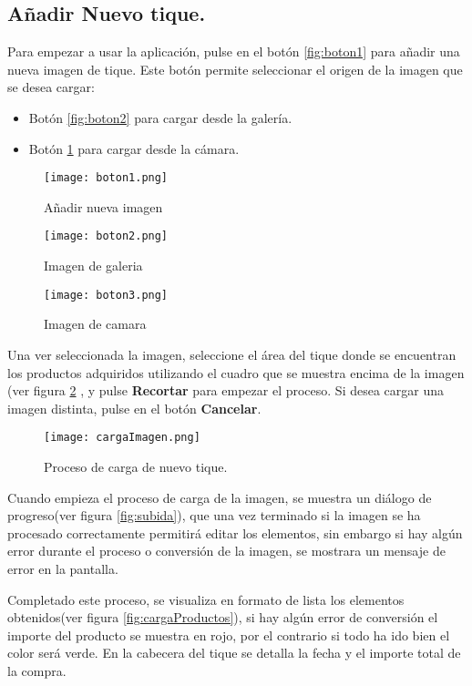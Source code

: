 \subsection{Añadir Nuevo tique.\label{nuevosTiques}}
 Para empezar a usar la aplicación, pulse en el botón \ref{fig:boton1}
 para añadir una nueva imagen de tique. Este botón permite seleccionar el origen de la imagen que se desea cargar:
 \begin{itemize}
 	\item Botón \ref{fig:boton2} para cargar desde la galería.
 	\item Botón \ref{fig:boton3} para cargar desde la cámara.
 \end{itemize}
 \begin{figure}[!htb] 
  \texttt{[image: boton1.png]}
  \caption{Añadir nueva imagen}\label{fig:boton1}
\endminipage\hfill
{}
  \texttt{[image: boton2.png]}
  \caption{Imagen de galeria}\label{fig:boton2}
\endminipage\hfill
{}%
  \texttt{[image: boton3.png]}
  \caption{Imagen de camara}\label{fig:boton3}
\endminipage
\end{figure}

Una ver seleccionada la imagen, seleccione el área del tique donde se encuentran los productos adquiridos utilizando el cuadro que se muestra encima de la imagen (ver figura \ref{fig:cargaImagen} , y pulse \textbf{Recortar} para empezar el proceso. Si desea cargar una imagen distinta, pulse en el botón \textbf{Cancelar}. 
\begin{figure}[ht]
\begin{center}
  \texttt{[image: cargaImagen.png]}
  \caption{Proceso de carga de nuevo tique.}\label{fig:cargaImagen}
\endminipage 
\end{center}
\end{figure}

Cuando empieza el proceso de carga de la imagen, se muestra un diálogo de progreso(ver figura \ref{fig:subida}), que una vez terminado si la imagen se ha procesado correctamente permitirá editar los elementos, sin embargo si hay algún error durante el proceso o conversión de la imagen, se mostrara un mensaje de error en la pantalla.

Completado este proceso, se visualiza en formato de lista los elementos obtenidos(ver figura \ref{fig:cargaProductos}), si hay algún error de conversión el importe del producto se muestra en rojo, por el contrario si todo ha ido bien el color será verde.
En la cabecera del tique se detalla la fecha y el importe total de la compra.

